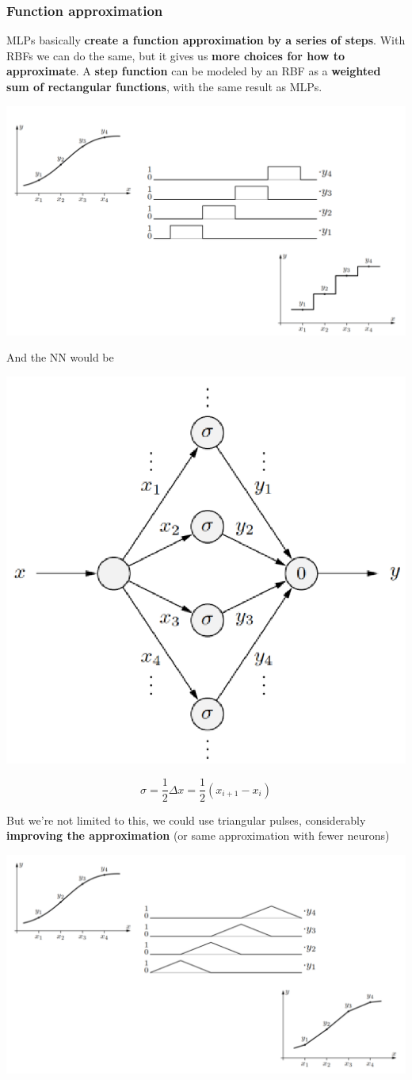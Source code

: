 \documentclass[11pt]{article}
\begin{document}
		\subsubsection{Function approximation}
		MLPs basically \textbf{create a function approximation by a series of steps}. With RBFs we can do the same, but it gives us \textbf{more choices for how to approximate}. A \textbf{step function} can be modeled by an RBF as a \textbf{weighted sum of rectangular functions}, with the same result as MLPs. 
		\begin{center}
			\includegraphics[width=0.85\columnwidth]{img/NN/FA1}
		\end{center}
		
		\newpage
		
		And the NN would be
		\begin{center}
			\includegraphics[width=0.5\columnwidth]{img/NN/FA2}
		\end{center}
		$$ \sigma = \frac{1}{2} \Delta x = \frac{1}{2} (x_{i+1} - x_i)$$
		
		But we're not limited to this, we could use triangular pulses, considerably \textbf{improving the approximation} (or same approximation with fewer neurons)
		\begin{center}
			\includegraphics[width=0.85\columnwidth]{img/NN/FA3}
		\end{center}
		
\end{document}
